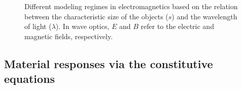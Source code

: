 \begin{figure}[tb]
   \centering

   \caption{Different modeling regimes in electromagnetics based on the
       relation between the characteristic size of the objects ($s$) and the
       wavelength of light ($\lambda$). In wave optics, $E$ and $B$ refer to
       the electric and magnetic fields, respectively.}
   \label{fig:EM_regime}
\end{figure}

\subsection*{Material responses via the constitutive equations}

